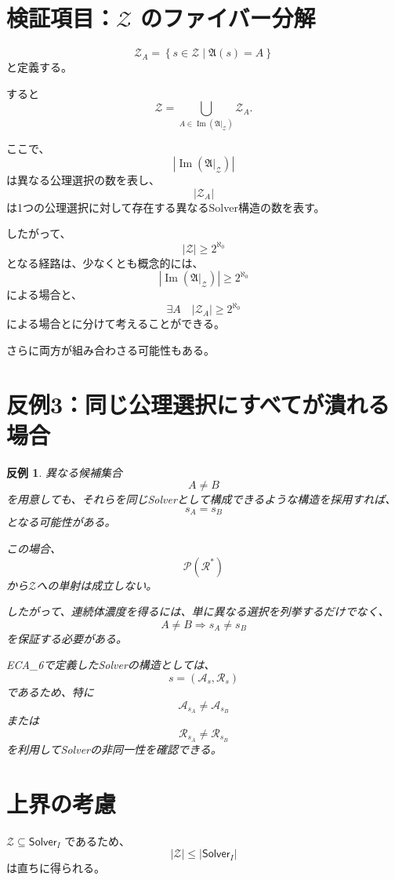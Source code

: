 \documentclass[a4paper,11pt]{article}
\newtheorem{counterexample}[definition]{反例}
\newcommand{\Solver}{\mathsf{Solver}}
\begin{document}
\section{検証項目：$\mathcal{Z}$ のファイバー分解}

\[
\mathcal{Z}_A
=
\left\{
s\in\mathcal{Z}
\mid
\mathfrak A(s)=A
\right\}
\]
と定義する。

すると
\[
\mathcal{Z}
=
\bigcup_{A\in
\operatorname{Im}(\mathfrak A|_{\mathcal{Z}})}
\mathcal{Z}_A.
\]

ここで、
\[
\left|\operatorname{Im}
(\mathfrak A|_{\mathcal{Z}})\right|
\]
は異なる公理選択の数を表し、
\[
|\mathcal{Z}_A|
\]
は1つの公理選択に対して存在する異なるSolver構造の数を表す。

したがって、
\[
|\mathcal{Z}|\ge2^{\aleph_0}
\]
となる経路は、少なくとも概念的には、
\[
\left|\operatorname{Im}
(\mathfrak A|_{\mathcal{Z}})\right|
\ge2^{\aleph_0}
\]
による場合と、
\[
\exists A\quad
|\mathcal{Z}_A|\ge2^{\aleph_0}
\]
による場合とに分けて考えることができる。

さらに両方が組み合わさる可能性もある。

\section{反例3：同じ公理選択にすべてが潰れる場合}

\begin{counterexample}
異なる候補集合
\[
A\neq B
\]
を用意しても、それらを同じSolverとして構成できるような構造を採用すれば、
\[
s_A=s_B
\]
となる可能性がある。

この場合、
\[
\mathcal{P}(\mathcal{R}^*)
\]
から\(\mathcal{Z}\)への単射は成立しない。

したがって、連続体濃度を得るには、単に異なる選択を列挙するだけでなく、
\[
A\neq B
\Longrightarrow
s_A\neq s_B
\]
を保証する必要がある。

ECA_6で定義したSolverの構造としては、
\[
s=(\mathcal{A}_s,\mathcal{R}_s)
\]
であるため、特に
\[
\mathcal{A}_{s_A}\neq\mathcal{A}_{s_B}
\]
または
\[
\mathcal{R}_{s_A}\neq\mathcal{R}_{s_B}
\]
を利用してSolverの非同一性を確認できる。
\end{counterexample}

\section{上界の考慮}
\(\mathcal{Z}\subseteq\Solver_I\) であるため、
\[
\boxed{
|\mathcal{Z}|
\le
|\Solver_I|
}
\]
は直ちに得られる。
\end{document}
